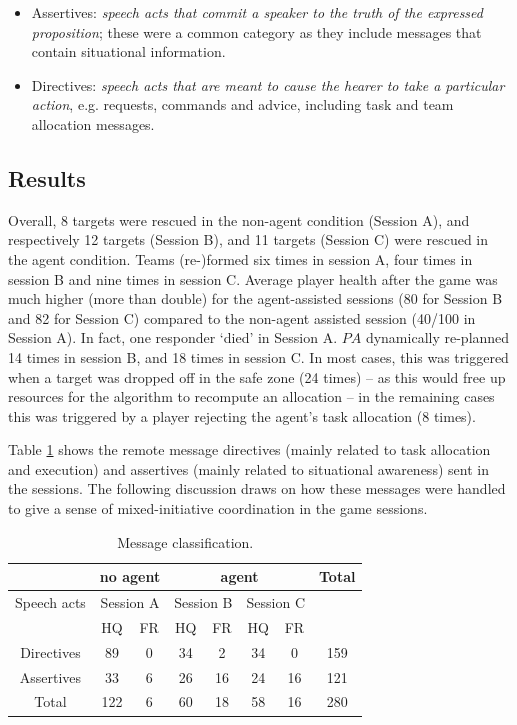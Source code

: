 \begin{itemize}
\item Assertives: \textit{speech acts that commit a speaker to the truth of the expressed proposition}; these were a common category as they include messages that contain situational information.
\item Directives: \textit{speech acts that are meant to cause the hearer to take a particular action}, e.g. requests, commands and advice, including task and team allocation messages. 
\end{itemize}

\subsection{Results}
\noindent Overall, 8 targets were rescued in the non-agent condition (Session A), and respectively 12 targets (Session B), and 11 targets (Session C) were rescued in the agent condition. Teams (re-)formed six times in session A, four times in session B and nine times  in session C. Average player health after the game was much higher (more than double) for the agent-assisted sessions (80 for Session B and 82 for Session C) compared to the non-agent assisted session (40/100 in Session A). In fact, one responder `died' in Session A.
$PA$ dynamically re-planned 14 times in session B, and 18 times in session C. In most cases, this was triggered when a target was dropped off in the safe zone (24 times) -- as this would free up resources for the algorithm to recompute an allocation -- in the remaining cases this was triggered by a player rejecting the agent's task allocation (8 times). 

Table \ref{tab:msgs} shows the remote message directives (mainly related to task allocation and execution) and assertives (mainly related to situational awareness) sent in the sessions. The following discussion draws on how these messages were handled to give a sense of mixed-initiative coordination in the game sessions.

\begin{table}\footnotesize\small
\begin{tabular}{c | c c | c c c c | c}
 & \multicolumn{2}{c|}{no agent} &  \multicolumn{4}{c|}{agent} & Total \\
 \hline
 Speech acts & \multicolumn{2}{c|}{Session A} & \multicolumn{2}{c}{Session B} & \multicolumn{2}{c|}{Session C} & \\
  & HQ & FR & HQ & FR & HQ & FR & \\
  \hline
  Directives & 89 & 0 & 34 & 2 & 34 & 0 & 159 \\
  Assertives & 33 & 6 & 26 & 16 & 24 & 16 & 121 \\
  \hline
  Total & 122 & 6 & 60 & 18 & 58 & 16 & 280 \\
\end{tabular}

 \caption{Message classification.} \label{tab:msgs}
\end{table}



